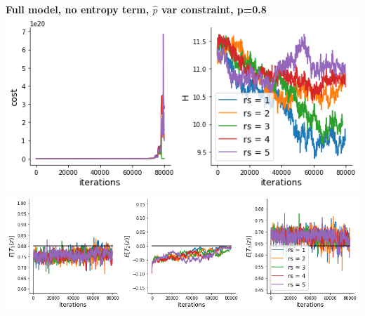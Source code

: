 \documentclass[11pt]{article}
\begin{document}
\begin{center}
\textbf{Full model, no entropy term, $\hat{p}$ var constraint, p=0.8} \\
\includegraphics[scale=0.6]{figs/cost_H_SC_pvar_full_c=0_p=80.png} \\
\includegraphics[scale=0.6]{figs/constraints_SC_pvar_full_c=0_p=80.png}
\end{center}
\end{document}
